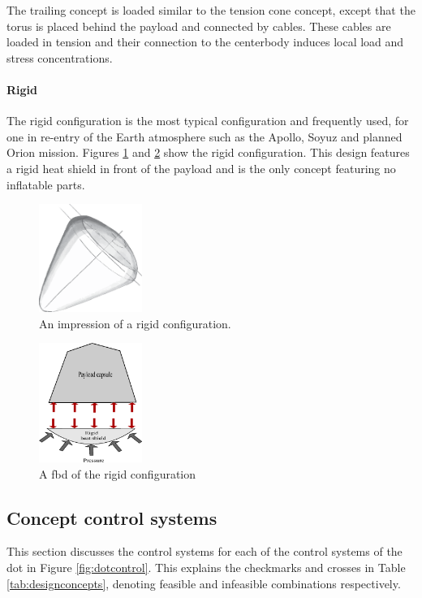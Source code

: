 The trailing concept is loaded similar to the tension cone concept, except that the torus is placed behind the payload and connected by cables. These cables are loaded in tension and their connection to the centerbody induces local load and stress concentrations.

\paragraph{Rigid}

The rigid configuration is the most typical configuration and frequently used, for one in re-entry of the Earth atmosphere such as the Apollo, Soyuz and planned Orion mission. Figures \ref{fig:conc_rigid} and \ref{fig:fbd_rigid} show the rigid configuration. This design features a rigid heat shield in front of the payload and is the only concept featuring no inflatable parts.

\begin{figure}[H]
\centering

\includegraphics[angle=180, width = 0.3\textwidth]{Figure/rigid.eps}
\caption{An impression of a rigid configuration.}

\label{fig:conc_rigid}
\end{figure}

\begin{figure}[H]
\centering
\includegraphics[width = 0.3\textwidth]{Figure/FBD_rigid.eps}
\caption{A \gls{fbd} of the rigid configuration}
\label{fig:fbd_rigid}
\end{figure}

\subsection{Concept control systems} \label{sec:ccs}
This section discusses the control systems for each of the control systems of the \gls{dot} in Figure  \ref{fig:dotcontrol}. This explains the checkmarks and crosses in Table \ref{tab:designconcepts}, denoting feasible and infeasible combinations respectively.


